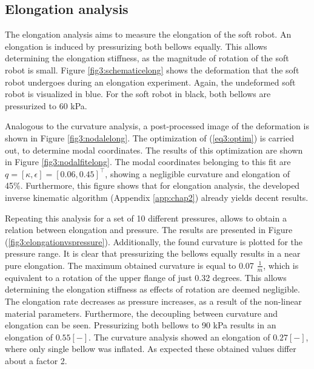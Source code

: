 \subsection{Elongation analysis}
\label{subsecelong}

The elongation analysis aims to measure the elongation of the soft robot. An elongation is induced by pressurizing both bellows equally. This allows determining the elongation stiffness, as the magnitude of rotation of the soft robot is small. Figure \ref{fig3:schematicelong} shows the deformation that the soft robot undergoes during an elongation experiment. Again, the undeformed soft robot is visualized in blue. For the soft robot in black, both bellows are pressurized to 60 kPa. 

Analogous to the curvature analysis, a post-processed image of the deformation is shown in Figure \ref{fig3:nodalelong}. The optimization of (\ref{eq3:optim}) is carried out, to determine modal coordinates. The results of this optimization are shown in Figure \ref{fig3:nodalfitelong}. The modal coordinates belonging to this fit are $q = [\kappa,\epsilon] = [0.06, 0.45]^\top$, showing a negligible curvature and elongation of 45\%. Furthermore, this figure shows that for elongation analysis, the developed inverse kinematic algorithm (Appendix \ref{app:chap2}) already yields decent results.  

Repeating this analysis for a set of 10 different pressures, allows to obtain a relation between elongation and pressure. The results are presented in Figure (\ref{fig3:elongationvspressure}). Additionally, the found curvature is plotted for the pressure range. It is clear that pressurizing the bellows equally results in a near pure elongation. The maximum obtained curvature is equal to 0.07 $\frac{1}{m}$, which is equivalent to a rotation of the upper flange of just 0.32 degrees. This allows determining the elongation stiffness as effects of rotation are deemed negligible. The elongation rate decreases as pressure increases, as a result of the non-linear material parameters. Furthermore, the decoupling between curvature and elongation can be seen. Pressurizing both bellows to 90 kPa results in an elongation of $0.55 [-]$. The curvature analysis showed an elongation of $0.27 [-]$, where only single bellow was inflated. As expected these obtained values differ about a factor 2. 



